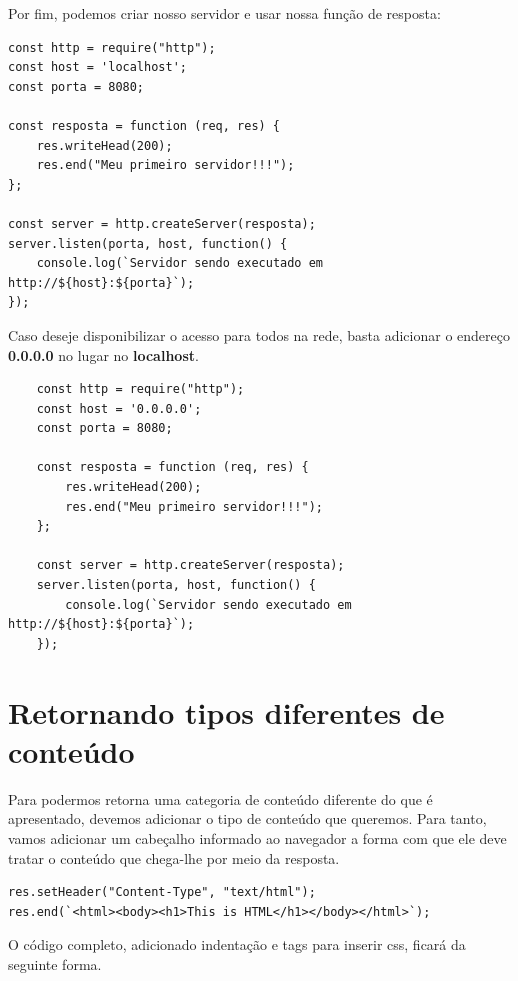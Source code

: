 Por fim, podemos criar nosso servidor e usar nossa função de resposta:

\begin{verbatim}
const http = require("http");
const host = 'localhost';
const porta = 8080;

const resposta = function (req, res) {
	res.writeHead(200);
	res.end("Meu primeiro servidor!!!");
};

const server = http.createServer(resposta);
server.listen(porta, host, function() {
	console.log(`Servidor sendo executado em http://${host}:${porta}`);
});
\end{verbatim}

Caso deseje disponibilizar o acesso para todos na rede, basta adicionar o endereço \textbf{0.0.0.0} no lugar no \textbf{localhost}.

\begin{verbatim}
	const http = require("http");
	const host = '0.0.0.0';
	const porta = 8080;
	
	const resposta = function (req, res) {
		res.writeHead(200);
		res.end("Meu primeiro servidor!!!");
	};
	
	const server = http.createServer(resposta);
	server.listen(porta, host, function() {
		console.log(`Servidor sendo executado em http://${host}:${porta}`);
	});
\end{verbatim}

\section{Retornando tipos diferentes de conteúdo}

Para podermos retorna uma categoria de conteúdo diferente do que é apresentado, devemos adicionar o tipo de conteúdo que queremos. Para tanto, vamos adicionar um cabeçalho informado ao navegador a forma com que ele deve tratar o conteúdo que chega-lhe por meio da resposta.

\begin{verbatim}
res.setHeader("Content-Type", "text/html");
res.end(`<html><body><h1>This is HTML</h1></body></html>`);
\end{verbatim}

O código completo, adicionado indentação e tags para inserir css,  ficará da seguinte forma. 

